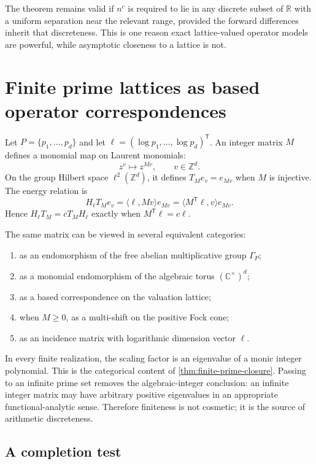 \documentclass[11pt,oneside]{article}
\theoremstyle{definition}
\theoremstyle{remark}
\newcommand{\Z}{\mathbb Z}
\newcommand{\R}{\mathbb R}
\newcommand{\C}{\mathbb C}
\begin{document}
The theorem remains valid if \(n^c\) is required to lie in any discrete
subset of \(\R\) with a uniform separation near the relevant range,
provided the forward differences inherit that discreteness.  This is
one reason exact lattice-valued operator models are powerful, while
asymptotic closeness to a lattice is not.

\section{Finite prime lattices as based operator correspondences}

Let \(P=\{p_1,\ldots,p_d\}\) and let
\(\ell=(\log p_1,\ldots,\log p_d)^{\mathsf T}\).
An integer matrix \(M\) defines a monomial map on Laurent monomials:
\[
 z^v\longmapsto z^{Mv},\qquad v\in\Z^d.
\]
On the group Hilbert space \(\ell^2(\Z^d)\), it defines
\(T_Me_v=e_{Mv}\) when \(M\) is injective.  The energy relation is
\[
 H_\ell T_Me_v
 =\langle\ell,Mv\rangle e_{Mv}
 =\langle M^{\mathsf T}\ell,v\rangle e_{Mv}.
\]
Hence \(H_\ell T_M=cT_MH_\ell\) exactly when
\(M^{\mathsf T}\ell=c\ell\).

The same matrix can be viewed in several equivalent categories:

\begin{enumerate}
\item as an endomorphism of the free abelian multiplicative group
      \(\Gamma_P\);
\item as a monomial endomorphism of the algebraic torus
      \((\C^\times)^d\);
\item as a based correspondence on the valuation lattice;
\item when \(M\geq0\), as a multi-shift on the positive Fock cone;
\item as an incidence matrix with logarithmic dimension vector
      \(\ell\).
\end{enumerate}

In every finite realization, the scaling factor is an eigenvalue of a
monic integer polynomial.  This is the categorical content of
\cref{thm:finite-prime-closure}.  Passing to an infinite prime set
removes the algebraic-integer conclusion: an infinite integer matrix may
have arbitrary positive eigenvalues in an appropriate functional-analytic
sense.  Therefore finiteness is not cosmetic; it is the source of
arithmetic discreteness.

\subsection{A completion test}
\end{document}
